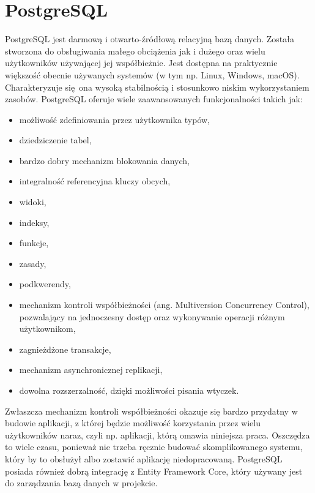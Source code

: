 \section{PostgreSQL}
PostgreSQL jest darmową i otwarto-źródłową relacyjną bazą danych. Została stworzona do obsługiwania małego obciążenia jak i dużego oraz wielu użytkowników używającej jej współbieżnie. Jest dostępna na praktycznie większość obecnie używanych systemów (w tym np. Linux, Windows, macOS). Charakteryzuje się ona wysoką stabilnością i stosunkowo niskim wykorzystaniem zasobów. PostgreSQL oferuje wiele zaawansowanych funkcjonalności takich jak: 
\begin{itemize}
    \item możliwość zdefiniowania przez użytkownika typów,
    \item dziedziczenie tabel,
    \item bardzo dobry mechanizm blokowania danych,
    \item integralność referencyjna kluczy obcych,
    \item widoki,
    \item indeksy,
    \item funkcje,
    \item zasady,
    \item podkwerendy,
    \item mechanizm kontroli współbieżności (ang. Multiversion Concurrency Control), pozwalający na jednoczesny dostęp oraz wykonywanie operacji różnym użytkownikom,
    \item zagnieżdżone transakcje,
    \item mechanizm asynchronicznej replikacji,
    \item dowolna rozszerzalność, dzięki możliwości pisania wtyczek.
\end{itemize}
Zwłaszcza mechanizm kontroli współbieżności okazuje się bardzo przydatny w budowie aplikacji, z której będzie możliwość korzystania przez wielu użytkowników naraz, czyli np. aplikacji, którą omawia niniejsza praca. Oszczędza to wiele czasu, ponieważ nie trzeba ręcznie budować skomplikowanego systemu, który by to obsłużył albo zostawić aplikację niedopracowaną. PostgreSQL posiada również dobrą integrację z Entity Framework Core, który używany jest do zarządzania bazą danych w projekcie.

